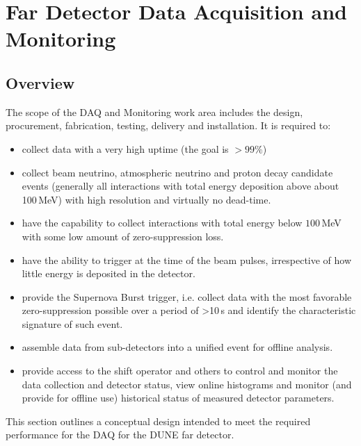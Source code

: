 \section{Far Detector Data Acquisition and Monitoring}
\label{sec:daq}

\subsection{Overview}

The scope of the DAQ and Monitoring work area includes the design, procurement, fabrication, testing, delivery and installation.
It is required to:
\begin{itemize}
\item collect data with a very high uptime (the goal is $>99\%$)

\item collect beam neutrino, atmospheric neutrino and proton  decay candidate events (generally all interactions
with total energy deposition above about 100\,MeV) with high resolution and virtually no dead-time.

\item have the capability to collect interactions with total energy  below $100$\,MeV with some
 low amount of zero-suppression loss.

\item have the ability to trigger at the time of the beam pulses,  irrespective of how little energy is deposited in the detector.

\item provide the Supernova Burst trigger, i.e. collect data with the most favorable zero-suppression possible over a  period of >10\,s
and identify the characteristic signature of such event.

\item assemble data from sub-detectors into a unified  event for offline analysis.
\item provide access to the shift operator and others to control and   monitor the data collection and detector status, view online
  histograms and monitor (and provide for offline use) historical  status of measured detector parameters. 

\end{itemize}
\noindent
This section outlines a conceptual design intended to meet the required performance for the DAQ
for the DUNE far detector. 


